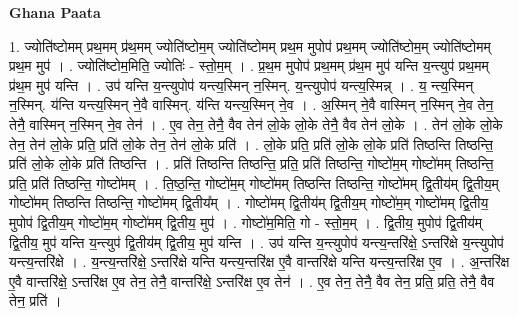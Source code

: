 \documentclass[17pt]{extarticle}
\begin{document}
\textbf{Ghana Paata } \newline

1. ज्योति॑ष्टोमम् प्रथ॒मम् प्र॑थ॒मम् ज्योति॑ष्टोम॒म् ज्योति॑ष्टोमम् प्रथ॒म मुपोप॑ प्रथ॒मम् ज्योति॑ष्टोम॒म् ज्योति॑ष्टोमम् प्रथ॒म मुप॑ । . ज्योति॑ष्टोम॒मिति॒ ज्योतिः॑ - स्तो॒म॒म् । . प्र॒थ॒म मुपोप॑ प्रथ॒मम् प्र॑थ॒म मुप॑ यन्ति य॒न्त्युप॑ प्रथ॒मम् प्र॑थ॒म मुप॑ यन्ति । . उप॑ यन्ति य॒न्त्युपोप॑ यन्त्य॒स्मिन् न॒स्मिन्. य॒न्त्युपोप॑ यन्त्य॒स्मिन्न् । . य॒ न्त्य॒स्मिन् न॒स्मिन्. य॑न्ति यन्त्य॒स्मिन् ने॒वै वास्मिन्. य॑न्ति यन्त्य॒स्मिन् ने॒व । . अ॒स्मिन् ने॒वै वास्मिन् न॒स्मिन् ने॒व तेन॒ तेनै॒ वास्मिन् न॒स्मिन् ने॒व तेन॑ । . ए॒व तेन॒ तेनै॒ वैव तेन॑ लो॒के लो॒के तेनै॒ वैव तेन॑ लो॒के । . तेन॑ लो॒के लो॒के तेन॒ तेन॑ लो॒के प्रति॒ प्रति॑ लो॒के तेन॒ तेन॑ लो॒के प्रति॑ । . लो॒के प्रति॒ प्रति॑ लो॒के लो॒के प्रति॑ तिष्ठन्ति तिष्ठन्ति॒ प्रति॑ लो॒के लो॒के प्रति॑ तिष्ठन्ति । . प्रति॑ तिष्ठन्ति तिष्ठन्ति॒ प्रति॒ प्रति॑ तिष्ठन्ति॒ गोष्टो॑म॒म् गोष्टो॑मम् तिष्ठन्ति॒ प्रति॒ प्रति॑ तिष्ठन्ति॒ गोष्टो॑मम् । . ति॒ष्ठ॒न्ति॒ गोष्टो॑म॒म् गोष्टो॑मम् तिष्ठन्ति तिष्ठन्ति॒ गोष्टो॑मम् द्वि॒तीय॑म् द्वि॒तीय॒म् गोष्टो॑मम् तिष्ठन्ति तिष्ठन्ति॒ गोष्टो॑मम् द्वि॒तीय᳚म् । . गोष्टो॑मम् द्वि॒तीय॑म् द्वि॒तीय॒म् गोष्टो॑म॒म् गोष्टो॑मम् द्वि॒तीय॒ मुपोप॑ द्वि॒तीय॒म् गोष्टो॑म॒म् गोष्टो॑मम् द्वि॒तीय॒ मुप॑ । . गोष्टो॑म॒मिति॒ गो - स्तो॒म॒म् । . द्वि॒तीय॒ मुपोप॑ द्वि॒तीय॑म् द्वि॒तीय॒ मुप॑ यन्ति य॒न्त्युप॑ द्वि॒तीय॑म् द्वि॒तीय॒ मुप॑ यन्ति । . उप॑ यन्ति य॒न्त्युपोप॑ यन्त्य॒न्तरि॑क्षे॒ ऽन्तरि॑क्षे य॒न्त्युपोप॑ यन्त्य॒न्तरि॑क्षे । . य॒न्त्य॒न्तरि॑क्षे॒ ऽन्तरि॑क्षे यन्ति यन्त्य॒न्तरि॑क्ष ए॒वै वान्तरि॑क्षे यन्ति यन्त्य॒न्तरि॑क्ष ए॒व । . अ॒न्तरि॑क्ष ए॒वै वान्तरि॑क्षे॒ ऽन्तरि॑क्ष ए॒व तेन॒ तेनै॒ वान्तरि॑क्षे॒ ऽन्तरि॑क्ष ए॒व तेन॑ । . ए॒व तेन॒ तेनै॒ वैव तेन॒ प्रति॒ प्रति॒ तेनै॒ वैव तेन॒ प्रति॑ । \newline
\end{document}
